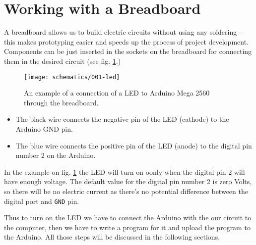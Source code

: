 \documentclass[../sparc.tex]{subfiles}
\begin{document}
\section{Working with a Breadboard}


A breadboard allows us to build electric circuits without using any soldering --
this makes prototyping easier and speeds up the process of project development.
Components can be just inserted in the sockets on the breadboard for connecting
them in the desired circuit (see fig. \ref{fig:breadboard-led}.)

\begin{figure}[ht]
  \centering
  \texttt{[image: schematics/001-led]}
  \caption{An example of a connection of a LED to Arduino Mega 2560 through the
    breadboard.}
  \label{fig:breadboard-led}
\end{figure}

\begin{itemize}
\item The black wire connects the negative pin of the LED (cathode) to the
  Arduino GND pin.
\item The blue wire connects the positive pin of the LED (anode) to the digital
  pin number 2 on the Arduino.
\end{itemize}


In the example on fig. \ref{fig:breadboard-led} the LED will turn on oonly when
the digital pin 2 will have enough voltage.  The default value for the digital
pin number 2 is zero Volts, so there will be no electric current as there's no
potential difference between the digital port and \texttt{GND} pin.

Thus to turn on the LED we have to connect the Arduino with the our circuit to
the computer, then we have to write a program for it and upload the program to
the Arduino.  All those steps will be discussed in the following sections.

\end{document}
